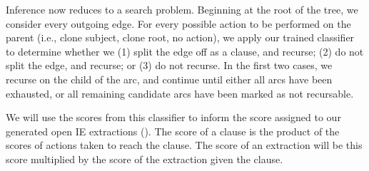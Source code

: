 
Inference now reduces to a search problem.
Beginning at the root of the tree, we consider every outgoing edge.
  For every possible action to be performed on the parent (i.e., clone subject,
  clone root, no action), we apply our trained classifier to determine
  whether we 
  (1) split the edge off as a clause, and recurse;
  (2) do not split the edge, and recurse; or 
  (3) do not recurse.
In the first two cases, we recurse on the child of the arc, and continue until
  either all arcs have been exhausted, or all remaining candidate arcs
  have been marked as not recursable.

We will use the scores from this classifier to inform the score assigned to
  our generated open IE extractions ().
The score of a clause is the product of the scores of actions taken to reach
  the clause.
The score of an extraction will be this score multiplied by the score
  of the extraction given the clause.
